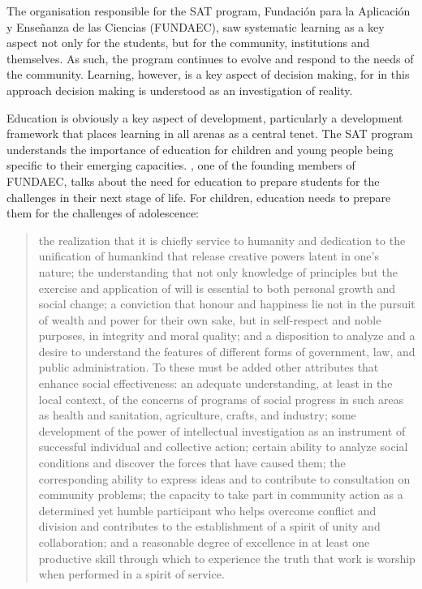 The organisation responsible for the SAT program, Fundación para la Aplicación y Enseñanza de las Ciencias (FUNDAEC), saw systematic learning as a key aspect not only for the students, but for the community, institutions and themselves. As such, the program continues to evolve and respond to the needs of the community. Learning, however, is a key aspect of decision making, for in this approach decision making is understood as an investigation of reality. %

Education is obviously a key aspect of development, particularly a development framework that places learning in all arenas as a central tenet. The SAT program understands the importance of education for children and young people being specific to their emerging capacities. \citet[][pp224-5]{Arbab2000}, one of the founding members of FUNDAEC, talks about the need for education to prepare students for the challenges in their next stage of life. For children, education needs to prepare them for the challenges of adolescence:
\begin{quote}
	the realization that it is chiefly service to humanity and dedication to the unification of humankind that release creative powers latent in one's nature; the understanding that not only knowledge of principles but the exercise and application of will is essential to both personal growth and social change; a conviction that honour and happiness lie not in the pursuit of wealth and power for their own sake, but in self-respect and noble purposes, in integrity and moral quality; and a disposition to analyze and a desire to understand the features of different forms of government, law, and public administration. To these must be added other attributes that enhance social effectiveness: an adequate understanding, at least in the local context, of the concerns of programs of social progress in such areas as health and sanitation, agriculture, crafts, and industry; some development of the power of intellectual investigation as an instrument of successful individual and collective action; certain ability to analyze social conditions and discover the forces that have caused them; the corresponding ability to express ideas and to contribute to consultation on community problems; the capacity to take part in community action as a determined yet humble participant who helps overcome conflict and division and contributes to the establishment of a spirit of unity and collaboration; and a reasonable degree of excellence in at least one productive skill through which to experience the truth that work is worship when performed in a spirit of service.
\end{quote}
